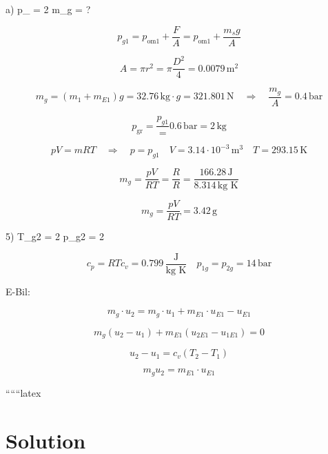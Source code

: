 a) \quad p_{} = 2 \quad m_{g} = ?

\[
p_{g1} = p_{\text{om1}} + \frac{F}{A} = p_{\text{om1}} + \frac{m_{s}g}{A}
\]

\[
A = \pi r^2 = \pi \frac{D^2}{4} = 0.0079 \, \text{m}^2
\]

\[
m_{g} = (m_{1} + m_{E1}) g = 32.76 \, \text{kg} \cdot g = 321.801 \, \text{N} \quad \Rightarrow \quad \frac{m_{g}}{A} = 0.4 \, \text{bar}
\]

\[
p_{\text{gr}} = \frac{p_{g1}} = 0.6 \, \text{bar} = 2 \, \text{kg}
\]

\[
p V = m R T \quad \Rightarrow \quad p = p_{g1} \quad V = 3.14 \cdot 10^{-3} \, \text{m}^3 \quad T = 293.15 \, \text{K}
\]

\[
m_{g} = \frac{p V}{R T} = \frac{R}{R} = \frac{166.28 \, \text{J}}{8.314 \, \text{kg K}}
\]

\[
m_{g} = \frac{p V}{R T} = 3.42 \, \text{g}
\]

5) \quad T_{g2} = 2 \quad p_{g2} = 2

\[
c_{p} = R T c_{v} = 0.799 \, \frac{\text{J}}{\text{kg K}} \quad p_{1g} = p_{2g} = 14 \, \text{bar}
\]

E-Bil:

\[
m_{g} \cdot u_{2} = m_{g} \cdot u_{1} + m_{E1} \cdot u_{E1} - u_{E1}
\]

\[
m_{g} (u_{2} - u_{1}) + m_{E1} (u_{2E1} - u_{1E1}) = 0
\]

\[
u_{2} - u_{1} = c_{v} (T_{2} - T_{1})
\]

\[
m_{g} u_{2} = m_{E1} \cdot u_{E1}
\]

``````latex


\section*{Solution}
